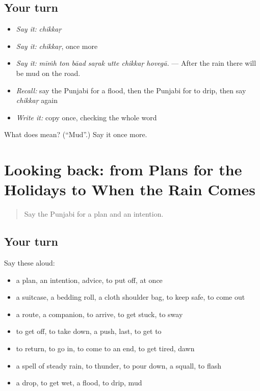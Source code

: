 \subsection*{Your turn}
\begin{itemize}
\raggedright
  \item \emph{Say it:} \emph{chikkaṛ}
  \item \emph{Say it:} \emph{chikkaṛ}, once more
  \item \emph{Say it:} \emph{mīṁh ton bāad saṛak utte chikkaṛ hovegā.} — After the rain there will be mud on the road.
  \item \emph{Recall:} say the Punjabi for a flood, then the Punjabi for to drip, then say \emph{chikkaṛ} again
  \item \emph{Write it:} copy \textbf{} once, checking the whole word
\end{itemize}

\begin{tcolorbox}[breakable,colback=teal!4,colframe=teal!35!black,title={Before you move on}]
What does  mean? (\textquotedblleft{}Mud\textquotedblright{}.) Say it once more.
\end{tcolorbox}
\section[(dialogue)]{Looking back: from Plans for the Holidays to When the Rain Comes}

\label{lesson:PA-R287-review-281-287}



\begin{quote}
Say the Punjabi for a plan and an intention.
\end{quote}

\subsection*{Your turn}
Say these aloud:

\begin{itemize}
\raggedright
  \item a plan, an intention, advice, to put off, at once
  \item a suitcase, a bedding roll, a cloth shoulder bag, to keep safe, to come out
  \item a route, a companion, to arrive, to get stuck, to sway
  \item to get off, to take down, a push, last, to get to
  \item to return, to go in, to come to an end, to get tired, dawn
  \item a spell of steady rain, to thunder, to pour down, a squall, to flash
  \item a drop, to get wet, a flood, to drip, mud
\end{itemize}

